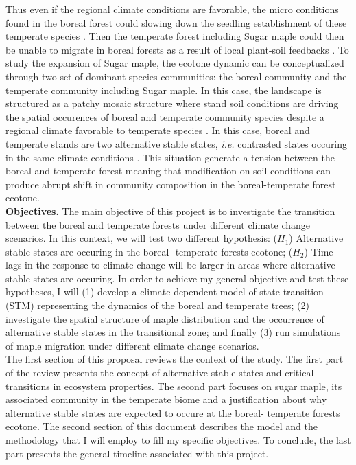 Thus even if the regional climate conditions are favorable, the micro conditions found in the boreal
forest could slowing down the seedling establishment of these temperate
species \cite{Kellman2004,Moore2008,Barras1998}. Then the temperate forest
including Sugar maple could then be unable to migrate in boreal forests as a
result of local plant-soil feedbacks \cite{McCarthyNeumann2012}. To study the
expansion of Sugar maple, the ecotone dynamic can be conceptualized through
two set of dominant species communities: the boreal community and the
temperate community including Sugar maple. In this case, the landscape is
structured as a patchy mosaic structure where stand soil conditions are
driving the spatial occurences of boreal and temperate community species
despite a regional climate favorable to temperate species
\cite{Goldblum2010,Fisichelli2013}. In this case, boreal and temperate stands
are two alternative stable states, \textit{i.e.} contrasted states occuring in
the same climate conditions \cite{scheffer2009critical}. This situation
generate a tension between the boreal and temperate forest meaning that
modification on soil conditions can produce abrupt shift in community
composition in the boreal-temperate forest ecotone.\\


\textbf{Objectives.} The main objective of this project is to investigate the
transition between the boreal and temperate forests under different climate
change scenarios. In this context, we will test two
different hypothesis: ($H_1$) Alternative stable states are occuring in the
boreal- temperate forests ecotone;  ($H_2$) Time lags in the response to
climate change will be larger in areas where alternative stable states are
occuring. In order to achieve my general objective and test these hypotheses,
I will (1) develop a climate-dependent model of state transition (STM)
representing the dynamics of the boreal and temperate trees; (2) investigate
the spatial structure of maple distribution and the occurrence of alternative
stable states in the transitional zone; and finally (3) run simulations of
maple migration under different climate change scenarios. \\

The first section of this proposal reviews the context of the study. The first
part of the review presents the concept of alternative stable states and
critical transitions in ecosystem properties. The second part focuses on sugar
maple, its associated community in the temperate biome and a justification
about why alternative stable states are expected to occure at the boreal-
temperate forests ecotone. The second section of this document describes the
model and the methodology that I will employ to fill my specific  objectives.
To conclude, the last part presents the general timeline associated with this
project.

